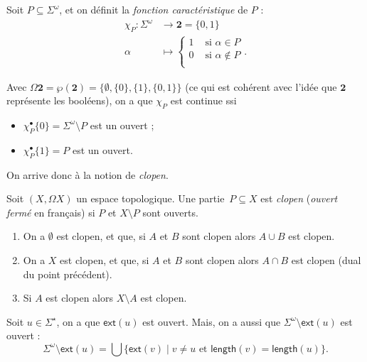 \documentclass[./main]{subfiles}
\begin{document}
  Soit $P \subseteq \Sigma^\omega$, et on définit la \textit{fonction caractéristique} de $P$ :
  \begin{align*}
    \chi_P: \Sigma^\omega &\longrightarrow \mathbf{2} = \{0,1\} \\
    \alpha &\longmapsto \begin{cases}
      1 & \text{ si } \alpha \in P\\
      0 & \text{ si } \alpha \not\in P\\
    \end{cases}
  .\end{align*}

  Avec $\Omega \mathbf{2} = \wp(\mathbf{2}) = \{\emptyset, \{0\} , \{1\} , \{0,1\}\}$ (ce qui est cohérent avec l'idée que $\mathbf{2}$ représente les booléens), on a que $\chi_P$ est continue ssi 
  \begin{itemize}
    \item $\chi_P^\bullet \{0\} = \Sigma^\omega \setminus P$ est un ouvert ;
    \item $\chi_P^\bullet \{1\} = P $ est un ouvert.
  \end{itemize}
  On arrive donc à la notion de \textit{clopen}.

  \begin{defn}
    Soit $(X, \Omega X)$ un espace topologique.
    Une partie~$P \subseteq X$ est \textit{clopen} (\textit{ouvert fermé} en français) si $P$ et $X \setminus P$ sont ouverts.
  \end{defn}

  \begin{rmk}
    \begin{enumerate}
      \item On a $\emptyset$ est clopen, et que, si $A$ et $B$ sont clopen alors $A \cup B$ est clopen.
      \item On a $X$ est clopen, et que, si $A$ et $B$ sont clopen alors $A \cap B$ est clopen (dual du point précédent).
      \item Si $A$ est clopen alors $X \setminus A$ est clopen.
    \end{enumerate}
  \end{rmk}

  \begin{exm}
    Soit $u \in \Sigma^\star$, on a que $\mathsf{ext}(u)$ est ouvert.
    Mais, on a aussi que $\Sigma^\omega \setminus \mathsf{ext}(u)$ est ouvert :
    \[
    \Sigma^\omega \setminus \mathsf{ext}(u) = \bigcup \{ \mathsf{ext}(v)  \mid v \neq u \text{ et } \mathsf{length}(v) = \mathsf{length}(u) \}
    .\]
  \end{exm}
\end{document}
